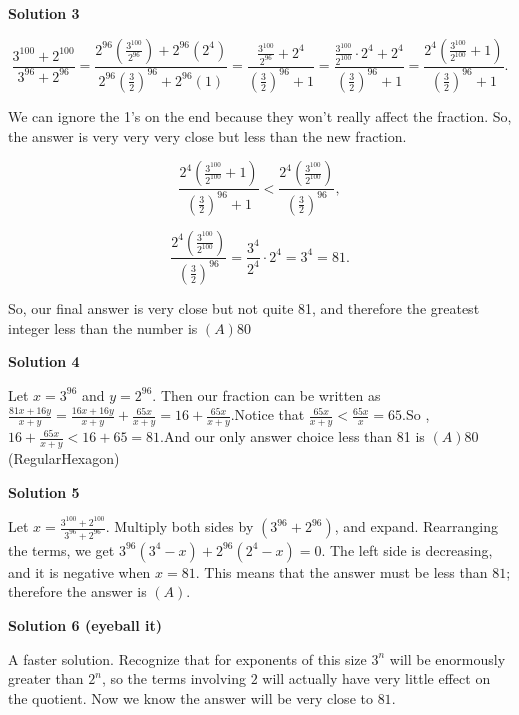 \begin{enumerate}
 



\textbf{Solution 3}


 \[\frac{3^{100}+2^{100}}{3^{96}+2^{96}}=\frac{2^{96}\left(\frac{3^{100}}{2^{96}}\right)+2^{96}\left(2^{4}\right)}{2^{96}\left(\frac{3}{2}\right)^{96}+2^{96}(1)}=\frac{\frac{3^{100}}{2^{96}}+2^{4}}{\left(\frac{3}{2}\right)^{96}+1}=\frac{\frac{3^{100}}{2^{100}}\cdot2^{4}+2^{4}}{\left(\frac{3}{2}\right)^{96}+1}=\frac{2^{4}\left(\frac{3^{100}}{2^{100}}+1\right)}{\left(\frac{3}{2}\right)^{96}+1}.\]

 We can ignore the 1's on the end because they won't really affect the fraction. So, the answer is very very very close but less than the new fraction.

 
 \[\frac{2^{4}\left(\frac{3^{100}}{2^{100}}+1\right)}{\left(\frac{3}{2}\right)^{96}+1}<\frac{2^{4}\left(\frac{3^{100}}{2^{100}}\right)}{\left(\frac{3}{2}\right)^{96}},\]

 \[\frac{2^{4}\left(\frac{3^{100}}{2^{100}}\right)}{\left(\frac{3}{2}\right)^{96}}=\frac{3^{4}}{2^{4}} \cdot 2^{4}=3^{4}=81.\]

 So, our final answer is very close but not quite 81, and therefore the greatest integer less than the number is $\boxed{(A) 80}$




\textbf{Solution 4}

Let $x=3^{96}$ and $y=2^{96}$. Then our fraction can be written as$\frac{81x+16y}{x+y}=\frac{16x+16y}{x+y}+\frac{65x}{x+y}=16+\frac{65x}{x+y}$.Notice that $\frac{65x}{x+y}<\frac{65x}{x}=65$.So ,$16+\frac{65x}{x+y}<16+65=81$.And our only answer choice less than 81 is $\boxed{(A) 80}$ (RegularHexagon)

 



\textbf{Solution 5}

Let $x=\frac{3^{100}+2^{100}}{3^{96}+2^{96}}$. Multiply both sides by $(3^{96}+2^{96})$, and expand. Rearranging the terms, we get $3^{96}(3^4-x)+2^{96}(2^4-x)=0$. The left side is decreasing, and it is negative when $x=81$. This means that the answer must be less than $81$; therefore the answer is $\boxed{(A)}$.

 



\textbf{Solution 6 (eyeball it)}

A faster solution. Recognize that for exponents of this size $3^{n}$ will be enormously greater than $2^{n}$, so the terms involving $2$ will actually have very little effect on the quotient. Now we know the answer will be very close to $81$.


\end{enumerate}
